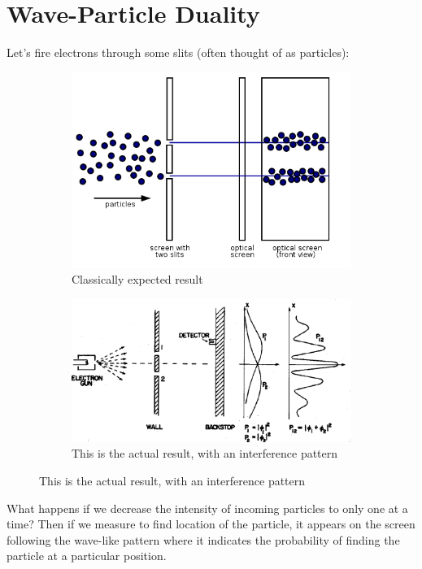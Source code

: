 \documentclass[a4paper, 11pt, normalem]{report}
\begin{document}
\section{Wave-Particle Duality}
Let's fire electrons through some slits (often thought of as particles):
\begin{figure}[H]
    \centering
    \begin{subfigure}{0.6\textwidth}
        \caption{Classically expected result}
        \includegraphics[width=\textwidth]{ClassicalDouble.png}
    \end{subfigure}

    \begin{subfigure}{0.8\textwidth}
        \caption{This is the actual result, with an interference pattern}
        \includegraphics[width=\textwidth]{ActualDouble.png}
    \end{subfigure}
\end{figure}
What happens if we decrease the intensity of incoming particles to only one at a time? 
Then if we measure to find location of the particle, it appears on the screen following the wave-like pattern where it indicates the probability of finding the particle at a particular position.
\end{document}
